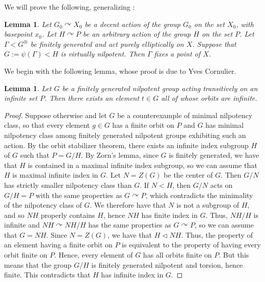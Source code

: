 \documentclass[12pt]{article}
\newtheorem{lem}[thm]{Lemma}
\theoremstyle{definition}
\begin{document}
We will prove the following, generalizing \cite[Lemma 4.7]{Algebraic}:

\begin{lem}
    \label{lem: nilpotent case}
    Let $G_0 \curvearrowright X_0$ be a decent action of the group $G_0$ on the set $X_0$, with basepoint $x_0$. Let $H \curvearrowright P$ be an arbitrary action of the group $H$ on the set $P$. Let $\Gamma < G^{\oplus}$ be finitely generated and act purely elliptically on $X$. Suppose that $G:= \psi(\Gamma) < H$ is virtually nilpotent. Then $\Gamma$ fixes a point of $X$. 
\end{lem}

We begin with the following lemma, whose proof is due to Yves Cornulier. 

\begin{lem}
    \label{lem: decent actions nilpotent}
    Let $G$ be a finitely generated nilpotent group acting transitively on an infinite set $P$. Then there exists an element $t \in G$ all of whose orbits are infinite. 
\end{lem}

\begin{proof}
    Suppose otherwise and let $G$ be a counterexample of minimal nilpotency class, so that every element $g \in G$ has a finite orbit on $P$ and $G$ has minimal nilpotency class among finitely generated nilpotent groups exhibiting such an action. By the orbit stabilizer theorem, there exists an infinite index subgroup $H$ of $G$ such that $P = G/H$. By Zorn's lemma, since $G$ is finitely generated, we have that $H$ is contained in a maximal infinite index subgroup, so we can assume that $H$ is maximal infinite index in $G$. Let $N = Z(G)$ be the center of $G$. Then $G/N$ has strictly smaller nilpotency class than $G$. If $N < H$, then $G/N$ acts on $G/H=P$ with the same properties as $G \curvearrowright P$, which contradicts the minimality of the nilpotency class of $G$. We therefore have that $N$ is not a subgroup of $H$, and so $NH$ properly contains $H$, hence $NH$ has finite index in $G$. Thus, $NH/H$ is infinite and $NH \curvearrowright NH/H$ has the same properties as $G \curvearrowright P$, so we can assume that $G = NH$. Since $N = Z(G)$, we have that $H \triangleleft NH$. Thus, the property of an element having a finite orbit on $P$ is equivalent to the property of having every orbit finite on $P$. Hence, every element of $G$ has all orbits finite on $P$. But this means that the group $G/H$ is finitely generated nilpotent and torsion, hence finite. This contradicts that $H$ has infinite index in $G$. 
\end{proof}
\end{document}
